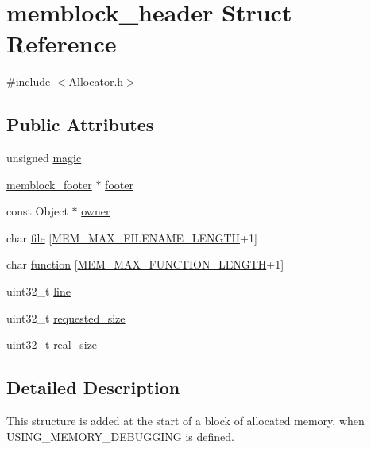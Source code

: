 \section{memblock\-\_\-header Struct Reference}
\label{structmemblock__header}


{\ttfamily \#include $<$Allocator.\-h$>$}

\subsection*{Public Attributes}
\begin{DoxyCompactItemize}
\item 
unsigned \hyperlink{structmemblock__header_a10ebc950edccb690a784aceb6362d696}{magic}
\item 
\hyperlink{structmemblock__footer}{memblock\-\_\-footer} $\ast$ \hyperlink{structmemblock__header_ab9999ece91b34ae2742865b27791b374}{footer}
\item 
const Object $\ast$ \hyperlink{structmemblock__header_a4a1f4790e308d4211fee21b6eceeebc4}{owner}
\item 
char \hyperlink{structmemblock__header_a97093dcb31daa58a36e471701b63d0d3}{file} \mbox{[}\hyperlink{_allocator_8h_ac811ed79333c5131bf74f609b0b67fcf}{M\-E\-M\-\_\-\-M\-A\-X\-\_\-\-F\-I\-L\-E\-N\-A\-M\-E\-\_\-\-L\-E\-N\-G\-T\-H}+1\mbox{]}
\item 
char \hyperlink{structmemblock__header_ab3a09c5ab1300cb51e93ff910431c40f}{function} \mbox{[}\hyperlink{_allocator_8h_af15f994b428f827c19ae31d1df47d7ca}{M\-E\-M\-\_\-\-M\-A\-X\-\_\-\-F\-U\-N\-C\-T\-I\-O\-N\-\_\-\-L\-E\-N\-G\-T\-H}+1\mbox{]}
\item 
uint32\-\_\-t \hyperlink{structmemblock__header_aa2bb67f4837cf735956c591e23e4c800}{line}
\item 
uint32\-\_\-t \hyperlink{structmemblock__header_a9f32a9108b8ca49a6296605b42ee3a54}{requested\-\_\-size}
\item 
uint32\-\_\-t \hyperlink{structmemblock__header_acbea4f5572643309ac41e9493baaa7f7}{real\-\_\-size}
\end{DoxyCompactItemize}


\subsection{Detailed Description}
This structure is added at the start of a block of allocated memory, when U\-S\-I\-N\-G\-\_\-\-M\-E\-M\-O\-R\-Y\-\_\-\-D\-E\-B\-U\-G\-G\-I\-N\-G is defined. 

